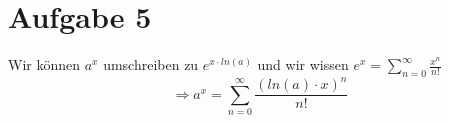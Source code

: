 \section{Aufgabe 5}
Wir können $a^x$ umschreiben zu $e^{x \cdot ln(a)}$ und wir wissen $e^x = \sum_{n=0}^{\infty} \frac{x^n}{n!}$ \\
$$\Rightarrow a^x = \sum_{n=0}^{\infty} \frac{(ln(a) \cdot x)^n}{n!}$$